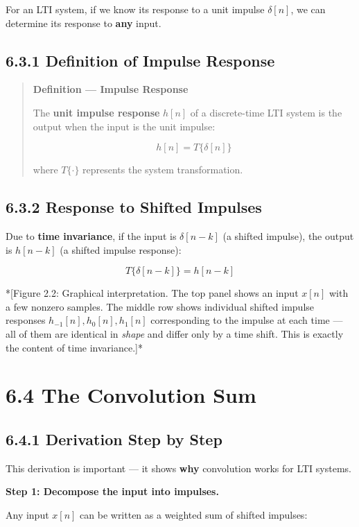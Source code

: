 \documentclass[11pt]{article}
\begin{document}
For an LTI system, if we know its response to a unit impulse $\delta[n]$, we can determine its response to \textbf{any} input.

\subsection*{6.3.1 Definition of Impulse Response}

\begin{quote}
\textbf{Definition — Impulse Response}

The \textbf{unit impulse response} $h[n]$ of a discrete-time LTI system is the output when the input is the unit impulse:

\[h[n] = T\{\delta[n]\}\]

where $T\{\cdot\}$ represents the system transformation.
\end{quote}

\subsection*{6.3.2 Response to Shifted Impulses}

Due to \textbf{time invariance}, if the input is $\delta[n-k]$ (a shifted impulse), the output is $h[n-k]$ (a shifted impulse response):

\[T\{\delta[n-k]\} = h[n-k]\]

*[Figure 2.2: Graphical interpretation. The top panel shows an input $x[n]$ with a few nonzero samples. The middle row shows individual shifted impulse responses $h_{-1}[n], h_0[n], h_1[n]$ corresponding to the impulse at each time — all of them are identical in \textit{shape} and differ only by a time shift. This is exactly the content of time invariance.]*

\section*{6.4 The Convolution Sum}

\subsection*{6.4.1 Derivation Step by Step}

This derivation is important — it shows \textbf{why} convolution works for LTI systems.

\textbf{Step 1: Decompose the input into impulses.}

Any input $x[n]$ can be written as a weighted sum of shifted impulses:
\end{document}

